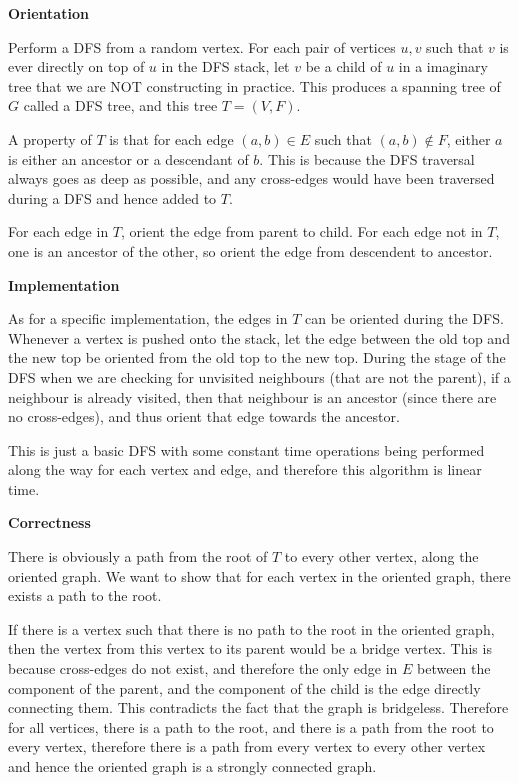 \documentclass{article}
\begin{document}
\begin{solution}

    \textbf{Orientation}
    
    Perform a DFS from a random vertex. 
    For each pair of vertices $u, v$ such that $v$ is ever directly on top of $u$ in the DFS stack,
    let $v$ be a child of $u$ in a imaginary tree that we are NOT constructing in practice. This produces a spanning tree of $G$ called a DFS tree, and this tree $T=(V, F)$.

    A property of $T$ is that for each edge $(a, b)\in E$ such that $(a, b)\notin F$, 
    either $a$ is either an ancestor or a descendant of $b$.
    This is because the DFS traversal always goes as deep as possible, and any cross-edges would have been traversed during a DFS and hence added to $T$.

    For each edge in $T$, orient the edge from parent to child.
    For each edge not in $T$, one is an ancestor of the other, so orient the edge from descendent to ancestor. 

    \textbf{Implementation}

    As for a specific implementation, the edges in $T$ can be oriented during the DFS.
    Whenever a vertex is pushed onto the stack, let the edge between the old top and the new top be oriented from the old top to the new top. 
    During the stage of the DFS when we are checking for unvisited neighbours (that are not the parent), if a neighbour is already visited, then that neighbour is an ancestor (since there are no cross-edges), and thus orient that edge towards the ancestor.
    
    This is just a basic DFS with some constant time operations being performed along the way for each vertex and edge, and therefore this algorithm is linear time.

    \textbf{Correctness}

    There is obviously a path from the root of $T$ to every other vertex, along the oriented graph.
    We want to show that for each vertex in the oriented graph, there exists a path to the root.

    If there is a vertex such that there is no path to the root in the oriented graph, 
    then the vertex from this vertex to its parent would be a bridge vertex.
    This is because cross-edges do not exist, and therefore the only edge in $E$ between the component of the parent, and the component of the child is the edge directly connecting them. 
    This contradicts the fact that the graph is bridgeless.
    Therefore for all vertices, there is a path to the root, and there is a path from the root to every vertex, therefore there is a path from every vertex to every other vertex and hence the oriented graph is a strongly connected graph.
\end{solution}
\end{document}

